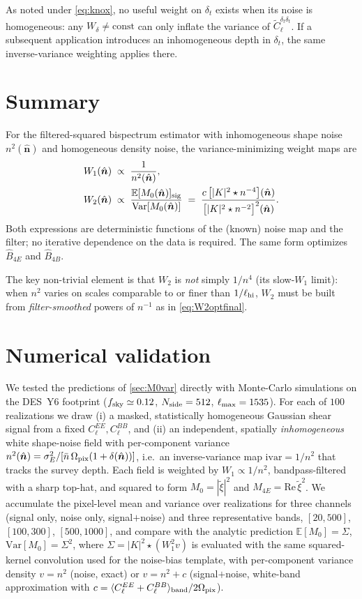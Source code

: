 \documentclass[11pt]{article}
\newcommand{\nv}{\hat{\boldsymbol{n}}}
\newcommand{\E}{\mathbb{E}}
\newcommand{\Var}{\mathrm{Var}}
\newcommand{\deltat}{\delta_t}
\newcommand{\Wone}{W_1}
\newcommand{\Wtwo}{W_2}
\begin{document}
As noted under \cref{eq:knox}, no useful weight on $\deltat$ exists when its
noise is homogeneous: any $W_\delta\neq\mathrm{const}$ can only inflate the
variance of $\tilde C^{\deltat\deltat}_\ell$. If a subsequent application
introduces an inhomogeneous depth in $\deltat$, the same inverse-variance
weighting applies there.

\section{Summary}

For the filtered-squared bispectrum estimator with inhomogeneous shape noise
$n^2(\nv)$ and homogeneous density noise, the variance-minimizing weight
maps are
\begin{align}
\Wone(\nv)\;&\propto\;\frac{1}{n^2(\nv)},
\label{eq:final_W1}\\
\Wtwo(\nv)\;&\propto\;\frac{\E[M_0(\nv)]_{\rm sig}}{\Var[M_0(\nv)]}
\;=\;\frac{c\,\bigl[|K|^2\star n^{-4}\bigr](\nv)}
{\bigl[|K|^2\star n^{-2}\bigr]^2(\nv)}.
\label{eq:final_W2}
\end{align}
Both expressions are deterministic functions of the (known) noise map and
the filter; no iterative dependence on the data is required. The same form
optimizes $\hat B_{4E}$ and $\hat B_{4B}$.

The key non-trivial element is that $\Wtwo$ is \emph{not} simply $1/n^4$
(its slow-$\Wone$ limit): when $n^2$ varies on scales comparable to or
finer than $1/\ell_{\rm hi}$, $\Wtwo$ must be built from
\emph{filter-smoothed} powers of $n^{-1}$ as in \cref{eq:W2optfinal}.

\section{Numerical validation}\label{sec:numcheck}

We tested the predictions of \cref{sec:M0var} directly with Monte-Carlo
simulations on the DES~Y6 footprint ($f_{\rm sky}\simeq0.12$,
$N_{\rm side}=512$, $\ell_{\rm max}=1535$). For each of $100$ realizations we
draw (i) a masked, statistically homogeneous Gaussian shear signal from a fixed
$C_\ell^{EE},C_\ell^{BB}$, and (ii) an independent, spatially \emph{inhomogeneous}
white shape-noise field with per-component variance
$n^2(\nv)=\sigma_E^2/[\bar n\,\Omega_{\rm pix}(1+\delta(\nv))]$, i.e.\ an
inverse-variance map $\mathrm{ivar}=1/n^2$ that tracks the survey depth. Each
field is weighted by $\Wone\propto1/n^2$, bandpass-filtered with a sharp top-hat,
and squared to form $M_0=|\tilde\xi|^2$ and $M_{4E}=\mathrm{Re}\,\tilde\xi^2$. We
accumulate the pixel-level mean and variance over realizations for three
channels (signal only, noise only, signal$+$noise) and three representative
bands, $[20,500]$, $[100,300]$, $[500,1000]$, and compare with the analytic
prediction $\E[M_0]=\Sigma$, $\Var[M_0]=\Sigma^2$, where
$\Sigma=|K|^2\!\star(\Wone^2 v)$ is evaluated with the same squared-kernel
convolution used for the noise-bias template, with per-component variance
density $v=n^2$ (noise, exact) or $v=n^2+c$ (signal$+$noise, white-band
approximation with $c=\langle C_\ell^{EE}+C_\ell^{BB}\rangle_{\rm band}/2\Omega_{\rm pix}$).
\end{document}
